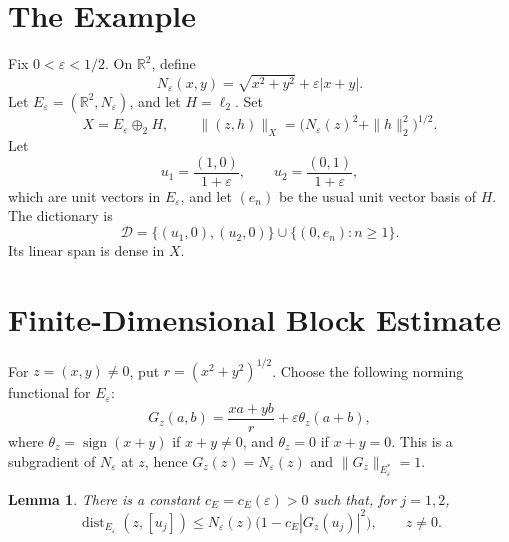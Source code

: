 \documentclass[11pt]{amsart}
\newtheorem{lemma}{Lemma}
\newcommand{\dist}{\operatorname{dist}}
\newcommand{\R}{\mathbb R}
\newcommand{\elltwo}{\ell_2}
\begin{document}
\section*{The Example}

Fix \(0<\varepsilon<1/2\). On \(\R^2\), define
\[
  N_\varepsilon(x,y)=\sqrt{x^2+y^2}+\varepsilon |x+y|.
\]
Let \(E_\varepsilon=(\R^2,N_\varepsilon)\), and let \(H=\elltwo\). Set
\[
  X=E_\varepsilon\oplus_2 H,\qquad
  \|(z,h)\|_X=\bigl(N_\varepsilon(z)^2+\|h\|_2^2\bigr)^{1/2}.
\]
Let
\[
  u_1=\frac{(1,0)}{1+\varepsilon},\qquad
  u_2=\frac{(0,1)}{1+\varepsilon},
\]
which are unit vectors in \(E_\varepsilon\), and let \((e_n)\) be the usual
unit vector basis of \(H\). The dictionary is
\[
  \mathcal D=\{(u_1,0),(u_2,0)\}\cup\{(0,e_n):n\geq1\}.
\]
Its linear span is dense in \(X\).

\section*{Finite-Dimensional Block Estimate}

For \(z=(x,y)\neq0\), put \(r=(x^2+y^2)^{1/2}\). Choose the following norming
functional for \(E_\varepsilon\):
\[
  G_z(a,b)=\frac{xa+yb}{r}+\varepsilon\theta_z(a+b),
\]
where \(\theta_z=\operatorname{sign}(x+y)\) if \(x+y\neq0\), and
\(\theta_z=0\) if \(x+y=0\). This is a subgradient of \(N_\varepsilon\) at
\(z\), hence \(G_z(z)=N_\varepsilon(z)\) and \(\|G_z\|_{E_\varepsilon^*}=1\).

\begin{lemma}\label{lem:block}
There is a constant \(c_E=c_E(\varepsilon)>0\) such that, for \(j=1,2\),
\[
  \dist_{E_\varepsilon}(z,[u_j])
  \leq N_\varepsilon(z)\bigl(1-c_E|G_z(u_j)|^2\bigr),
  \qquad z\neq0.
\]
\end{lemma}
\end{document}

